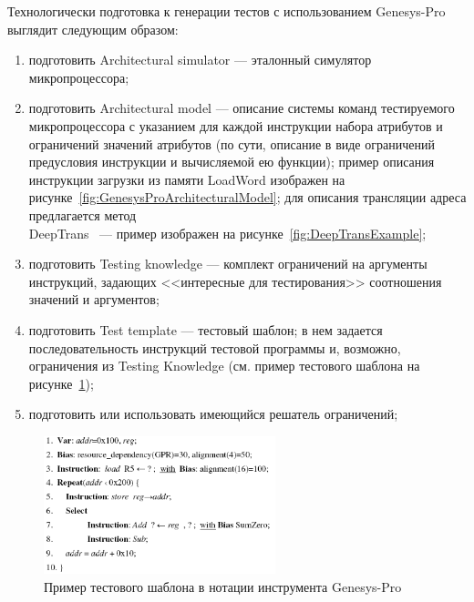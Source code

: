 Технологически подготовка к генерации тестов с использованием Genesys-Pro выглядит следующим образом:
\begin{enumerate}
    \item подготовить Architectural simulator --- эталонный симулятор микропроцессора;
    \item подготовить Architectural model --- описание системы команд тестируемого микропроцессора с указанием для каждой инструкции набора атрибутов и ограничений значений атрибутов (по сути, описание в виде ограничений предусловия инструкции и вычисляемой ею функции); пример описания инструкции загрузки из памяти LoadWord изображен на рисунке~\ref{fig:GenesysProArchitecturalModel}; для описания трансляции адреса предлагается метод\\DeepTrans~\cite{DeepTrans} --- пример изображен на рисунке~\ref{fig:DeepTransExample};
    \item подготовить Testing knowledge --- комплект ограничений на аргументы инструкций, задающих <<интересные для тестирования>> соотношения значений и аргументов;
    \item подготовить Test template --- тестовый шаблон; в нем задается последовательность инструкций тестовой программы и, возможно, ограничения из Testing Knowledge (см. пример тестового шаблона на рисунке~\ref{fig:genesysPro_template});
    \item подготовить или использовать имеющийся решатель ограничений;
\end{enumerate}

\begin{figure}[h] \center
  \includegraphics[width=0.6\textwidth]{4.analysis/genesys_tmpl}
  \caption{Пример тестового шаблона в нотации инструмента Genesys-Pro}\label{fig:genesysPro_template}
\end{figure}

